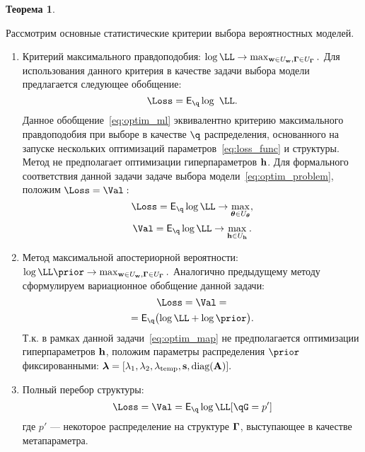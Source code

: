 \documentclass[11pt, a5paper]{dissert}
\theoremstyle{definition}
\newtheorem{theorem}{Теорема}
\begin{document}
{\begin{theorem}
\end{theorem}

Рассмотрим основные статистические критерии выбора вероятностных моделей. 
\begin{enumerate}
\item Критерий максимального правдоподобия:
$\log \LL \to \max_{\w \in \Uw, \G \in \UG}.$
Для использования данного критерия в качестве задачи выбора модели предлагается следующее обобщение:
\begin{equation}
\label{eq:optim_ml}
    \Loss =  \E_{\q} \log~\LL.
\end{equation}
Данное обобщение~\eqref{eq:optim_ml} эквивалентно  критерию максимального правдоподобия при выборе в качестве $\q$ распределения, основанного на запуске нескольких  оптимизаций параметров~\eqref{eq:loss_func} и структуры.
Метод не предполагает оптимизации гиперпараметров $\mathbf{h}$. Для формального соответствия данной задачи задаче выбора модели~\eqref{eq:optim_problem}, положим $\Loss=\Val:$
\[
    \Loss =  \E_{\q}\log \LL \to \max_{\teta \in \Uteta},
\]
\[
    \Val =  \E_{\q}\log \LL \to \max_{\h \in \Uh}.
\]



\item Метод максимальной апостериорной вероятности:
$\log \LL \prior \to \max_{\w  \in \Uw, \G \in \UG}.$
Аналогично предыдущему методу сформулируем вариационное обобщение данной задачи:
\begin{equation}
\label{eq:optim_map}
\Loss = \Val = 
\end{equation}
\[
 = \E_{\q} \bigl( \log\LL + \log\prior \bigr).
\]
Т.к. в рамках данной задачи~\eqref{eq:optim_map} не предполагается оптимизации гиперпараметров $\mathbf{h}$, положим параметры распределения $\prior$ фиксированными:
$
   \boldsymbol{\lambda} = [\lambda_1, \lambda_2, \lambda_{\text{temp}}, \mathbf{s}, \text{diag}(\mathbf{A})].
$

\item Полный перебор структуры:
\begin{equation}
\label{eq:optim_struct}
    \Loss = \Val = \E_{\q} \log \LL [\qG = p']
\end{equation}
где $p'$ --- некоторое распределение на структуре $\boldsymbol{\Gamma}$, выступающее в качестве метапараметра.





\end{enumerate}}
\end{document}
